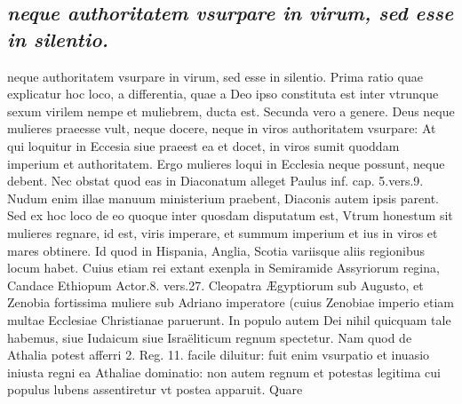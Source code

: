 \documentclass{article}
\begin{document}
\begin{pages}
\subsection*{\textit{neque authoritatem vsurpare in virum, sed esse in silentio.}}neque authoritatem vsurpare in virum, sed esse in silentio. Prima ratio quae explicatur hoc loco, a differentia, quae a Deo ipso constituta est inter vtrunque sexum virilem nempe et muliebrem, ducta est. Secunda vero a genere. Deus neque mulieres praeesse vult, neque docere, neque in viros authoritatem vsurpare: At qui loquitur in Eccesia siue praeest ea et docet, in viros sumit quoddam imperium et authoritatem. Ergo mulieres loqui in Ecclesia neque possunt, neque debent. Nec obstat quod eas in Diaconatum alleget Paulus inf. cap. 5.vers.9. Nudum enim illae manuum ministerium praebent, Diaconis autem ipsis parent. Sed ex hoc loco de eo quoque inter quosdam disputatum est, Vtrum honestum sit mulieres regnare, id est, viris imperare, et summum imperium et ius in viros et mares obtinere. Id quod in Hispania, Anglia, Scotia variisque aliis regionibus locum habet. Cuius etiam rei extant exenpla in Semiramide Assyriorum regina, Candace Ethiopum Actor.8. vers.27. Cleopatra Ægyptiorum sub Augusto, et Zenobia fortissima muliere sub Adriano imperatore (cuius Zenobiae imperio etiam multae Ecclesiae Christianae paruerunt. In populo autem Dei nihil quicquam tale habemus, siue Iudaicum siue Israëliticum regnum spectetur. Nam quod de Athalia potest afferri 2. Reg. 11. facile diluitur: fuit enim vsurpatio et inuasio iniusta regni ea Athaliae dominatio: non autem regnum et potestas legitima cui populus lubens assentiretur vt postea apparuit. Quare  \pend

\end{pages}
\end{document}
